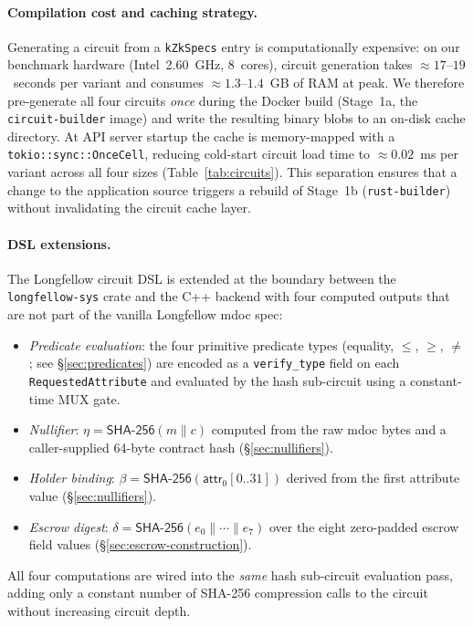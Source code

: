 \paragraph{Compilation cost and caching strategy.}
Generating a circuit from a \texttt{kZkSpecs} entry is computationally expensive: on our
benchmark hardware (Intel~2.60~GHz, 8~cores), circuit generation takes
${\approx}17$--$19$~seconds per variant and consumes ${\approx}1.3$--$1.4$~GB of RAM at peak.
We therefore pre-generate all four circuits \emph{once} during the Docker build (Stage~1a,
the \texttt{circuit-builder} image) and write the resulting binary blobs to an on-disk cache
directory.
At API server startup the cache is memory-mapped with a \texttt{tokio::sync::OnceCell},
reducing cold-start circuit load time to ${\approx}0.02$~ms per variant across all
four sizes (Table~\ref{tab:circuits}).
This separation ensures that a change to the application source triggers a rebuild of
Stage~1b (\texttt{rust-builder}) without invalidating the circuit cache layer.

\paragraph{DSL extensions.}
The Longfellow circuit DSL is extended at the boundary between the \texttt{longfellow-sys}
crate and the C++ backend with four computed outputs that are not part of the vanilla
Longfellow mdoc spec:
\begin{itemize}
  \item \emph{Predicate evaluation}: the four primitive predicate types
        (equality, $\leq$, $\geq$, $\neq$; see \S\ref{sec:predicates})
        are encoded as a \texttt{verify\_type} field on each \texttt{RequestedAttribute}
        and evaluated by the hash sub-circuit using a constant-time MUX gate.
  \item \emph{Nullifier}: $\eta = \mathsf{SHA\text{-}256}(m \| c)$ computed from the raw mdoc
        bytes and a caller-supplied 64-byte contract hash (\S\ref{sec:nullifiers}).
  \item \emph{Holder binding}: $\beta = \mathsf{SHA\text{-}256}(\mathsf{attr}_0[0..31])$
        derived from the first attribute value (\S\ref{sec:nullifiers}).
  \item \emph{Escrow digest}: $\delta = \mathsf{SHA\text{-}256}(e_0 \| \cdots \| e_7)$ over the
        eight zero-padded escrow field values (\S\ref{sec:escrow-construction}).
\end{itemize}
All four computations are wired into the \emph{same} hash sub-circuit evaluation pass,
adding only a constant number of SHA-256 compression calls to the circuit without increasing
circuit depth.

